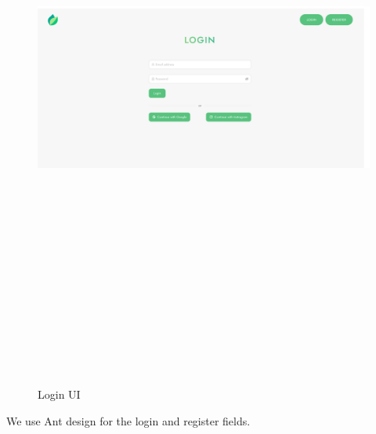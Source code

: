 \begin{figure}[!hb]
\centering
\caption[Login UI]{Login UI}%
\label{fig:login_ui}
\includegraphics[width=\linewidth,height=20cm,keepaspectratio]{img/login_ui}
\end{figure}

We use Ant design for the login and register fields. 

\clearpage

